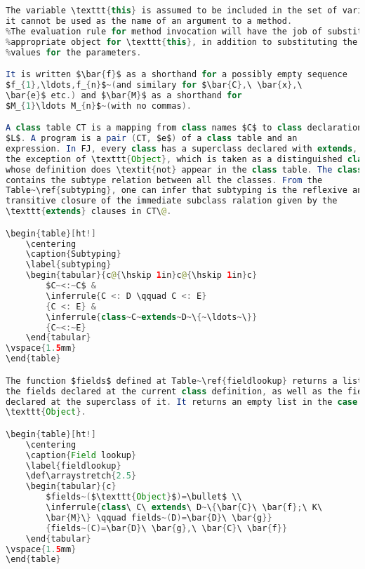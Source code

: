 \begin{lstlisting}[language=Java]
The variable \texttt{this} is assumed to be included in the set of variables, but
it cannot be used as the name of an argument to a method. 
%The evaluation rule for method invocation will have the job of substituing an
%appropriate object for \texttt{this}, in addition to substituting the argument
%values for the parameters.

It is written $\bar{f}$ as a shorthand for a possibly empty sequence
$f_{1},\ldots,f_{n}$~(and similary for $\bar{C},\ \bar{x},\
\bar{e}$ etc.) and $\bar{M}$ as a shorthand for
$M_{1}\ldots M_{n}$~(with no commas).

A class table CT is a mapping from class names $C$ to class declarations
$L$. A program is a pair (CT, $e$) of a class table and an
expression. In FJ, every class has a superclass declared with extends, with
the exception of \texttt{Object}, which is taken as a distinguished class name
whose definition does \textit{not} appear in the class table. The class table
contains the subtype relation between all the classes. From the
Table~\ref{subtyping}, one can infer that subtyping is the reflexive and
transitive closure of the immediate subclass ralation given by the
\texttt{extends} clauses in CT\@. 

\begin{table}[ht!]
	\centering
    \caption{Subtyping}
    \label{subtyping}
	\begin{tabular}{c@{\hskip 1in}c@{\hskip 1in}c}
		$C~<:~C$ & 
		\inferrule{C <: D \qquad C <: E}
		{C <: E} &
		\inferrule{class~C~extends~D~\{~\ldots~\}}
		{C~<:~E} 
	\end{tabular}
\vspace{1.5mm}
\end{table}

The function $fields$ defined at Table~\ref{fieldlookup} returns a list of all
the fields declared at the current class definition, as well as the fields
declared at the superclass of it. It returns an empty list in the case of
\texttt{Object}.

\begin{table}[ht!]
	\centering
    \caption{Field lookup}
    \label{fieldlookup}
	\def\arraystretch{2.5}
	\begin{tabular}{c}
		$fields~($\texttt{Object}$)=\bullet$ \\
		\inferrule{class\ C\ extends\ D~\{\bar{C}\ \bar{f};\ K\
		\bar{M}\} \qquad fields~(D)=\bar{D}\ \bar{g}}
		{fields~(C)=\bar{D}\ \bar{g},\ \bar{C}\ \bar{f}}
	\end{tabular}
\vspace{1.5mm}
\end{table}


\end{lstlisting}
